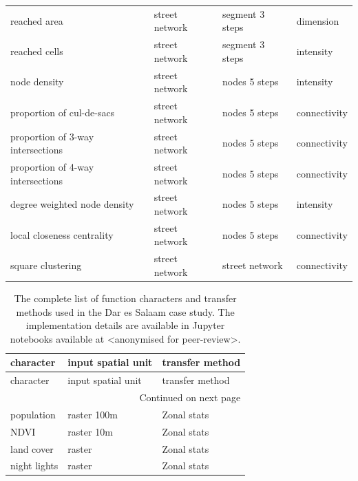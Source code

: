 \begin{longtable}{p{5cm}p{4cm}p{4cm}l}
                            reached area &                  street network &            segment 3 steps &    dimension \\
                           reached cells &                  street network &            segment 3 steps &    intensity \\
                            node density &                  street network &              nodes 5 steps &    intensity \\
               proportion of cul-de-sacs &                  street network &              nodes 5 steps & connectivity \\
       proportion of 3-way intersections &                  street network &              nodes 5 steps & connectivity \\
       proportion of 4-way intersections &                  street network &              nodes 5 steps & connectivity \\
            degree weighted node density &                  street network &              nodes 5 steps &    intensity \\
              local closeness centrality &                  street network &              nodes 5 steps & connectivity \\
                       square clustering &                  street network &             street network & connectivity \\
\end{longtable}


\begin{longtable}{p{5cm}p{3cm}p{5cm}}
    \caption{The complete list of function characters and transfer methods used in the Dar es Salaam case study. The implementation details are available
    in Jupyter notebooks available at <anonymised for peer-review>.}
    \label{tab:fn_des} \\
    \toprule
                                             character & input spatial unit &                                    transfer method \\
    \midrule
    \endfirsthead

    \toprule
                                             character & input spatial unit &                                    transfer method \\
    \midrule
    \endhead
    \midrule
    \multicolumn{3}{r}{{Continued on next page}} \\
    \midrule
    \endfoot

    \bottomrule
    \endlastfoot
    population & raster 100m &     Zonal stats \\
          NDVI &  raster 10m &     Zonal stats \\
    land cover &      raster &     Zonal stats \\
  night lights &      raster &     Zonal stats \\
\end{longtable}


